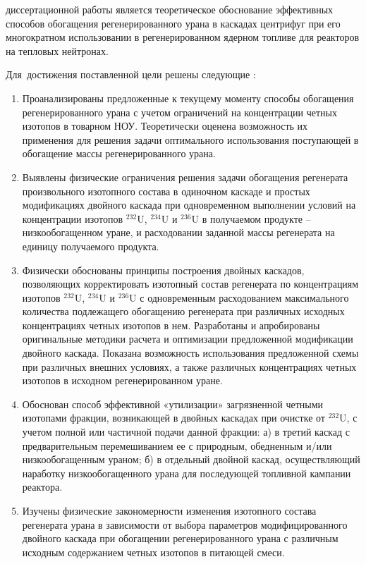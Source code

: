 {\aim} диссертационной работы является теоретическое обоснование эффективных способов обогащения регенерированного урана в каскадах центрифуг при его многократном использовании в регенерированном ядерном топливе для реакторов на тепловых нейтронах.

Для~достижения поставленной цели решены следующие {\tasks}:
\begin{enumerate}
  \item Проанализированы предложенные к текущему моменту способы обогащения регенерированного урана с учетом ограничений на концентрации четных изотопов в товарном НОУ. Теоретически оценена возможность их применения для решения задачи оптимального использования поступающей в обогащение массы регенерированного урана. 
  \item Выявлены физические ограничения решения задачи обогащения регенерата произвольного изотопного состава в одиночном каскаде и простых модификациях двойного каскада при одновременном выполнении условий на концентрации изотопов $^{232}$U, $^{234}$U и $^{236}$U в получаемом продукте -- низкообогащенном уране, и расходовании заданной массы регенерата на единицу получаемого продукта.
  \item Физически обоснованы принципы построения двойных каскадов,
  позволяющих корректировать изотопный состав регенерата по концентрациям
  изотопов $^{232}$U, $^{234}$U и $^{236}$U с одновременным расходованием максимального количества
  подлежащего обогащению регенерата при различных исходных концентрациях
  четных изотопов в нем. Разработаны и апробированы оригинальные методики расчета и оптимизации предложенной модификации двойного каскада. Показана возможность использования предложенной схемы при различных внешних условиях, а также различных концентрациях четных изотопов в исходном регенерированном уране.
  \item Обоснован способ эффективной «утилизации» загрязненной четными изотопами фракции, возникающей в двойных каскадах при очистке от $^{232}$U, с учетом полной или
  частичной подачи данной фракции: а) в третий каскад с предварительным
  перемешиванием ее с природным, обедненным и/или низкообогащенным ураном; б) в отдельный двойной каскад, осуществляющий наработку низкообогащенного урана для последующей топливной кампании реактора.
  \item Изучены физические закономерности изменения изотопного состава регенерата урана в зависимости от выбора параметров модифицированного двойного каскада при обогащении регенерированного урана с различным исходным содержанием четных изотопов в питающей смеси.
\end{enumerate}


